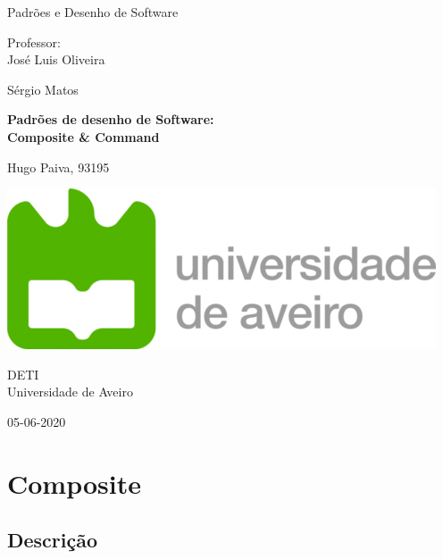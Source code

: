 \documentclass[10pt,portuguese]{article}
\begin{document}
\begin{titlepage}
	\clearpage\thispagestyle{empty}
	\centering
	\vspace{2cm}

	
	{\Large  Padrões e Desenho de Software \par}
	\vspace{0.5cm}
	{\small Professor: \\
	José Luis Oliveira\par
	Sérgio Matos\par}
	\vspace{4cm}
	{ \textbf{Padrões de desenho de Software:}} \\
	\vspace{0.5cm}
	{\Huge \textbf{Composite \& Command}} \\
	\vspace{1cm}
	\vspace{4cm}
	{\normalsize  Hugo Paiva, 93195
	   \par}
	 
	\vspace{2cm}

    \includegraphics[scale=0.20]{logo_ua.png}
    
    \vspace{2cm}
    
	{\normalsize DETI \\ 
		Universidade de Aveiro \par}
		
	{\normalsize 05-06-2020 \par}
	\vspace{2cm}
		
	
	\pagebreak

\end{titlepage}
\tableofcontents{}
\clearpage

\section{Composite}
\subsection{Descrição}
\end{document}
